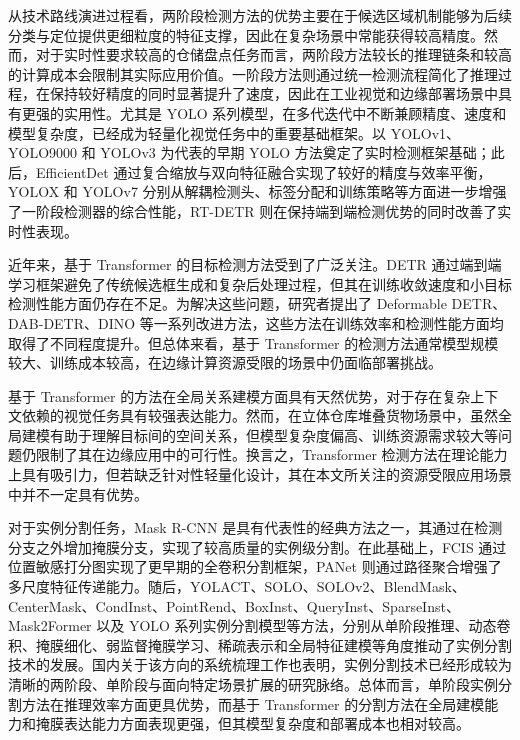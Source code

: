 从技术路线演进过程看，两阶段检测方法的优势主要在于候选区域机制能够为后续分类与定位提供更细粒度的特征支撑，因此在复杂场景中常能获得较高精度。然而，对于实时性要求较高的仓储盘点任务而言，两阶段方法较长的推理链条和较高的计算成本会限制其实际应用价值。一阶段方法则通过统一检测流程简化了推理过程，在保持较好精度的同时显著提升了速度，因此在工业视觉和边缘部署场景中具有更强的实用性。尤其是 YOLO 系列模型，在多代迭代中不断兼顾精度、速度和模型复杂度，已经成为轻量化视觉任务中的重要基础框架。以 YOLOv1、YOLO9000 和 YOLOv3 为代表的早期 YOLO 方法奠定了实时检测框架基础\cite{redmon2016yolo,redmon2017yolo9000,redmon2018yolov3}；此后，EfficientDet 通过复合缩放与双向特征融合实现了较好的精度与效率平衡，YOLOX 和 YOLOv7 分别从解耦检测头、标签分配和训练策略等方面进一步增强了一阶段检测器的综合性能，RT-DETR 则在保持端到端检测优势的同时改善了实时性表现\cite{tan2020efficientdet,ge2021yolox,wang2023yolov7,zhao2024rtdetr}。

近年来，基于 Transformer 的目标检测方法受到了广泛关注。DETR 通过端到端学习框架避免了传统候选框生成和复杂后处理过程\cite{carion2020detr}，但其在训练收敛速度和小目标检测性能方面仍存在不足。为解决这些问题，研究者提出了 Deformable DETR、DAB-DETR、DINO 等一系列改进方法\cite{zhu2021deformable,liu2022dab,zhang2022dino}，这些方法在训练效率和检测性能方面均取得了不同程度提升。但总体来看，基于 Transformer 的检测方法通常模型规模较大、训练成本较高，在边缘计算资源受限的场景中仍面临部署挑战。

基于 Transformer 的方法在全局关系建模方面具有天然优势，对于存在复杂上下文依赖的视觉任务具有较强表达能力。然而，在立体仓库堆叠货物场景中，虽然全局建模有助于理解目标间的空间关系，但模型复杂度偏高、训练资源需求较大等问题仍限制了其在边缘应用中的可行性。换言之，Transformer 检测方法在理论能力上具有吸引力，但若缺乏针对性轻量化设计，其在本文所关注的资源受限应用场景中并不一定具有优势。

对于实例分割任务，Mask R-CNN 是具有代表性的经典方法之一，其通过在检测分支之外增加掩膜分支，实现了较高质量的实例级分割\cite{he2017maskrcnn}。在此基础上，FCIS 通过位置敏感打分图实现了更早期的全卷积分割框架，PANet 则通过路径聚合增强了多尺度特征传递能力\cite{li2017fcis,liu2018panet}。随后，YOLACT、SOLO、SOLOv2、BlendMask、CenterMask、CondInst、PointRend、BoxInst、QueryInst、SparseInst、Mask2Former 以及 YOLO 系列实例分割模型等方法\cite{bolya2019yolact,wang2020solo,wang2020solov2,chen2020blendmask,lee2020centermask,tian2020condinst,kirillov2020pointrend,tian2021boxinst,fang2021queryinst,cheng2022sparseinst,cheng2022mask2former,ultralytics2025yolo11}，分别从单阶段推理、动态卷积、掩膜细化、弱监督掩膜学习、稀疏表示和全局特征建模等角度推动了实例分割技术的发展。国内关于该方向的系统梳理工作也表明，实例分割技术已经形成较为清晰的两阶段、单阶段与面向特定场景扩展的研究脉络\cite{su2022instancesegsurveycn}。总体而言，单阶段实例分割方法在推理效率方面更具优势，而基于 Transformer 的分割方法在全局建模能力和掩膜表达能力方面表现更强，但其模型复杂度和部署成本也相对较高。

